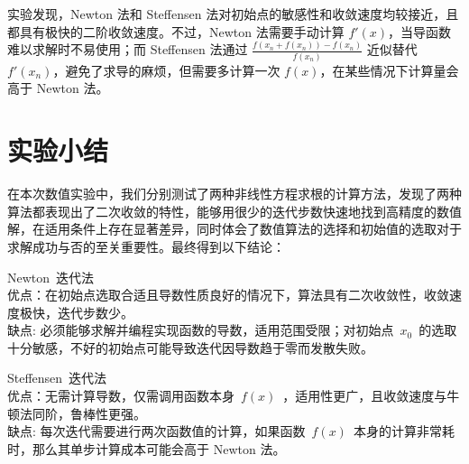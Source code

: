 \documentclass[UTF8]{ctexart}
\begin{document}
实验发现，Newton 法和 Steffensen 法对初始点的敏感性和收敛速度均较接近，且都具有极快的二阶收敛速度。不过，Newton 法需要手动计算 $f'(x)$，当导函数难以求解时不易使用；而 Steffensen 法通过 $\frac{f(x_n + f(x_n)) - f(x_n)}{f(x_n)}$ 近似替代 $f'(x_n)$，避免了求导的麻烦，但需要多计算一次 $f(x)$，在某些情况下计算量会高于 Newton 法。



%

\section{实验小结}
在本次数值实验中，我们分别测试了两种非线性方程求根的计算方法，发现了两种算法都表现出了二次收敛的特性，能够用很少的迭代步数快速地找到高精度的数值解，在适用条件上存在显著差异，同时体会了数值算法的选择和初始值的选取对于求解成功与否的至关重要性。最终得到以下结论：

Newton~迭代法\\
优点：在初始点选取合适且导数性质良好的情况下，算法具有二次收敛性，收敛速度极快，迭代步数少。 \\
缺点: 必须能够求解并编程实现函数的导数，适用范围受限；对初始点~$x_0$~的选取十分敏感，不好的初始点可能导致迭代因导数趋于零而发散失败。

Steffensen~迭代法\\
优点：无需计算导数，仅需调用函数本身~$f(x)$~，适用性更广，且收敛速度与牛顿法同阶，鲁棒性更强。 \\
缺点: 每次迭代需要进行两次函数值的计算，如果函数~$f(x)$~本身的计算非常耗时，那么其单步计算成本可能会高于 Newton 法。
\end{document}
